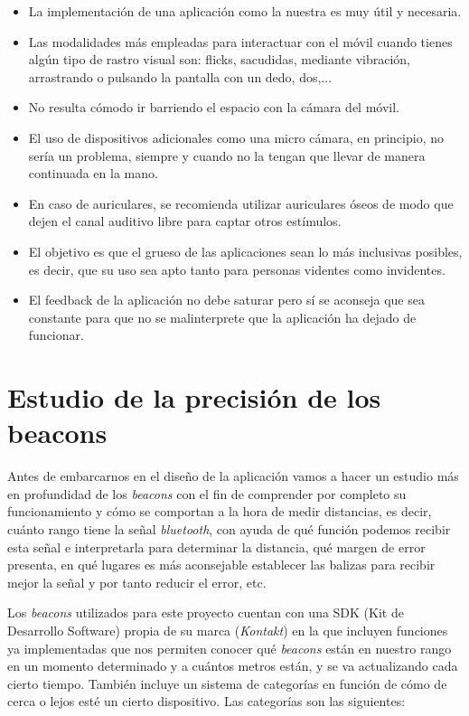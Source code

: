 \begin{itemize}
	\item La implementación de una aplicación como la nuestra es muy útil y necesaria.
	\item Las modalidades más empleadas para interactuar con el móvil cuando tienes algún tipo de rastro visual son: flicks, sacudidas, mediante vibración, arrastrando o pulsando la pantalla con un dedo, dos,...
	\item No resulta cómodo ir barriendo el espacio con la cámara del móvil.
	\item El uso de dispositivos adicionales como una micro cámara, en principio, no sería un problema, siempre y cuando no la tengan que llevar de manera continuada en la mano.
	\item En caso de auriculares, se recomienda utilizar auriculares óseos de modo que dejen el canal auditivo libre para captar otros estímulos.
	\item El objetivo es que el grueso de las aplicaciones sean lo más inclusivas posibles, es decir, que su uso sea apto tanto para personas videntes como invidentes.
	\item El feedback de la aplicación no debe saturar pero sí se aconseja que sea constante para que no se malinterprete que la aplicación ha dejado de funcionar.
\end{itemize}


\section{Estudio de la precisión de los beacons}

Antes de embarcarnos en el diseño de la aplicación vamos a hacer un estudio más en profundidad de los \textit{beacons} con el fin de comprender por completo su funcionamiento y cómo se comportan a la hora de medir distancias, es decir, cuánto rango tiene la señal \textit{bluetooth}, con ayuda de qué función podemos recibir esta señal e interpretarla para determinar la distancia, qué margen de error presenta, en qué lugares es más aconsejable establecer las balizas para recibir mejor la señal y por tanto reducir el error, etc. 

Los \textit{beacons} utilizados para este proyecto cuentan con una SDK (Kit de Desarrollo Software) propia de su marca (\textit{Kontakt}) en la que incluyen funciones ya implementadas que nos permiten conocer qué \textit{beacons} están en nuestro rango en un momento determinado y a cuántos metros están, y se va actualizando cada cierto tiempo. También incluye un sistema de categorías en función de cómo de cerca o lejos esté un cierto dispositivo. Las categorías son las siguientes:

